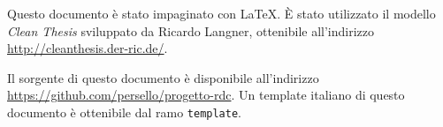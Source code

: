 %
\pagestyle{empty}
\hfill
\vfill

Questo documento è stato impaginato con \LaTeX.
È stato utilizzato il modello \textit{Clean Thesis} sviluppato da Ricardo Langner, ottenibile all'indirizzo \url{http://cleanthesis.der-ric.de/}.


Il sorgente di questo documento è disponibile all'indirizzo \url{https://github.com/persello/progetto-rdc}. Un template italiano di questo documento è ottenibile dal ramo \texttt{template}.
